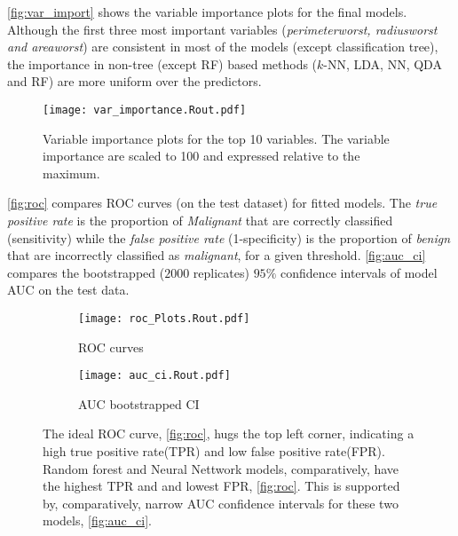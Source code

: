 \clearpage
\noindent \autoref{fig:var_import} shows the variable importance plots for the final models. Although the first three most important variables (\textit{perimeterworst, radiusworst and areaworst}) are consistent in most of the models (except classification tree), the importance in non-tree (except RF) based methods ($k$-NN, LDA, NN, QDA and RF) are more uniform over the predictors.
\noindent\begin{figure}[H]
    \centering
    \texttt{[image: var\_importance.Rout.pdf]}\vspace{-0.3cm}
    \caption{\small{Variable importance plots for the top 10 variables. The variable importance are scaled to 100 and expressed relative to the maximum.}}\label{fig:var_import}
\end{figure}

\clearpage
\noindent \autoref{fig:roc} compares ROC curves (on the test dataset) for fitted models. The \textit{true positive rate} is the proportion of \textit{Malignant} that are correctly classified (sensitivity) while the \textit{false positive rate} (1-specificity) is the proportion of \textit{benign} that are incorrectly classified as \textit{malignant}, for a given threshold. \autoref{fig:auc_ci} compares the bootstrapped ($2000$ replicates) $95\%$ confidence intervals of model AUC on the test data.

\noindent\begin{figure}[H]
    \centering
    \begin{subfigure}[b]{0.4\textwidth}
        \texttt{[image: roc\_Plots.Rout.pdf]}
        \caption{\small{ROC curves}}\label{fig:roc}
    \end{subfigure}
    \begin{subfigure}[b]{0.4\textwidth}
        \texttt{[image: auc\_ci.Rout.pdf]}
        \caption{\small{AUC bootstrapped CI}}\label{fig:auc_ci}
    \end{subfigure}    
    \caption{\small{The ideal ROC curve, \autoref{fig:roc}, hugs the top left corner, indicating a high true positive rate(TPR) and low false positive rate(FPR). Random forest and Neural Nettwork models, comparatively, have the highest TPR and and lowest FPR, \autoref{fig:roc}. This is supported by, comparatively, narrow AUC confidence intervals for these two models, \autoref{fig:auc_ci}.}}\label{fig:roc_ci}
\end{figure}

